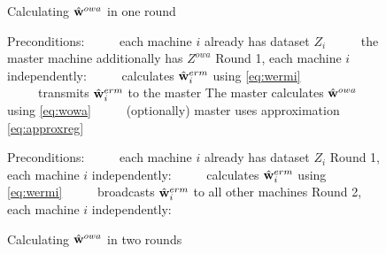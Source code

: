 \documentclass[thesis.tex]{subfiles}
\newcommand{\Zowa}{Z^{\textit{owa}}}
\begin{document}
\begin{wrapfigure}{R}{0.475\textwidth}
\vspace{-0.30in}
\begin{minipage}{0.475\textwidth}
\begin{algorithm}[H]
\caption{Calculating $\hat{\mathbf w}^{owa}$ in one round}
\label{alg:distributed}
\begin{algorithmic}
    \State \hspace{-0.1in}Preconditions: 
    \State \hspace{-0.1in}~~~~~each machine $i$ already has dataset $Z_i$
    \State \hspace{-0.1in}~~~~~the master machine additionally has $\Zowa$
    \State \hspace{-0.1in}Round 1, each machine $i$ independently:
    \State \hspace{-0.1in}~~~~~calculates $\hat{\mathbf w}^{erm}_i$ using \eqref{eq:wermi}
    \State \hspace{-0.1in}~~~~~transmits $\hat{\mathbf w}^{erm}_i$ to the master
    \State \hspace{-0.1in}The master calculates $\hat{\mathbf w}^{owa}$ using \eqref{eq:wowa} %
    \State \hspace{-0.1in}~~~~~(optionally) master uses approximation \eqref{eq:approxreg}
\end{algorithmic}
\label{fig:alg1}
\end{algorithm}
\vspace{-0.25in}
\begin{algorithm}[H]
\caption{Calculating $\hat{\mathbf w}^{owa}$ in two rounds}
\label{alg:distributed}
\begin{algorithmic}
    \State \hspace{-0.1in}Preconditions:
    \State \hspace{-0.1in}~~~~~each machine $i$ already has dataset $Z_i$
    \State \hspace{-0.1in}Round 1, each machine $i$ independently:
    \State \hspace{-0.1in}~~~~~calculates $\hat{\mathbf w}^{erm}_i$ using \eqref{eq:wermi}
    \State \hspace{-0.1in}~~~~~broadcasts $\hat{\mathbf w}^{erm}_i$ to all other machines
    \State \hspace{-0.1in}Round 2, each machine $i$ independently:

\end{algorithmic}
\end{algorithm}
\end{minipage}
\end{wrapfigure}
\end{document}
